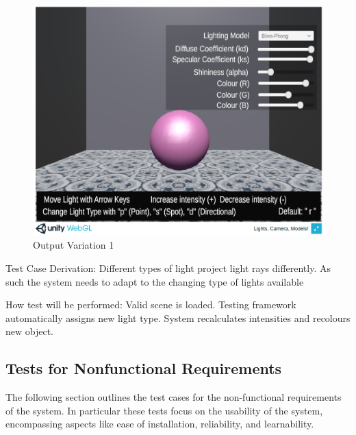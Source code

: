 \documentclass[12pt, titlepage]{article}
\begin{document}
\begin{enumerate}
	\begin{figure}[h]
		\centering
		\includegraphics[scale=0.25]{./images/sphere-lit-direction}
		\caption{Output Variation 1}
		\label{fig:directional}
	\end{figure}	
	
	
	Test Case Derivation: Different types of light project light rays 
	differently. As such the system needs to adapt to the changing type of 
	lights available
	
	How test will be performed: Valid scene is loaded. Testing framework 
	automatically assigns new light type. System recalculates 
	intensities and recolours new object.
	
\end{enumerate}


\subsection{Tests for Nonfunctional Requirements}
The following section outlines the test cases for the non-functional 
requirements of the system. In particular these tests focus on the usability of 
the system, encompassing aspects like ease of installation, reliability, and 
learnability.
%
%
\end{document}
